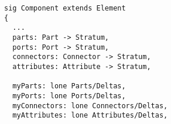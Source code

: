 \lstset{frame=tb, aboveskip=12pt, belowskip=-3pt, breaklines=true, basicstyle=\small\ttfamily, tabsize=2, mathescape=true}
\begin{lstlisting}[caption={structure.als, lines 74-91}, label=alloy:component, captionpos=b]
sig Component extends Element
{
  ...
  parts: Part -> Stratum,
  ports: Port -> Stratum,
  connectors: Connector -> Stratum,
  attributes: Attribute -> Stratum,
  
  myParts: lone Parts/Deltas,
  myPorts: lone Ports/Deltas,
  myConnectors: lone Connectors/Deltas,
  myAttributes: lone Attributes/Deltas,
\end{lstlisting}